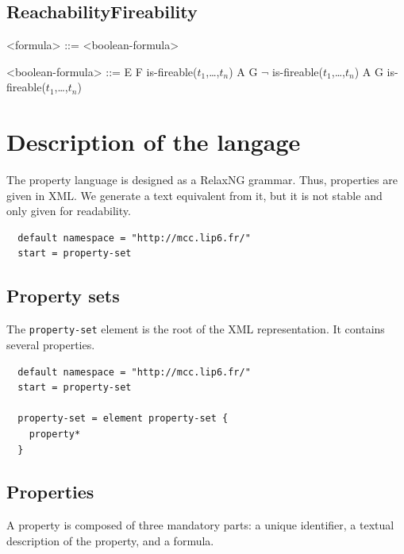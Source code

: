 \documentclass[10pt,english,a4paper]{article}
\begin{document}
\subsection{ReachabilityFireability}

\begin{grammar}

<formula> ::= <boolean-formula>

<boolean-formula> ::= E F is-fireable($t_1$,\dots,$t_n$)
\alt A G $\lnot$ is-fireable($t_1$,\dots,$t_n$)
\alt A G is-fireable($t_1$,\dots,$t_n$)

\end{grammar}


\section{Description of the langage}
The property language is designed as a RelaxNG grammar. Thus, properties are given in XML.
We generate a text equivalent from it, but it is not stable and only given for readability.

\begin{lstlisting}
  default namespace = "http://mcc.lip6.fr/"
  start = property-set
\end{lstlisting}
\subsection{Property sets}
The \lstinline[language=xsd]!property-set! element is the root of the XML representation.
It contains several properties.
\begin{lstlisting}
  default namespace = "http://mcc.lip6.fr/"
  start = property-set

  property-set = element property-set {
    property*
  }
\end{lstlisting}

\subsection{Properties}
A property is composed of three mandatory parts: a unique identifier, a textual description
of the property, and a formula.
\end{document}
